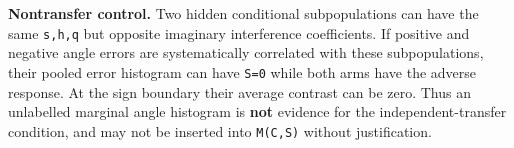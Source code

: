 \documentclass[
  10pt,
  a4paper,
]{article}
\begin{document}
\textbf{Nontransfer control.} Two hidden conditional subpopulations can have the same \texttt{s,h,q} but opposite imaginary interference coefficients. If positive and negative angle errors are systematically correlated with these subpopulations, their pooled error histogram can have \texttt{S=0} while both arms have the adverse response. At the sign boundary their average contrast can be zero. Thus an unlabelled marginal angle histogram is \textbf{not} evidence for the independent-transfer condition, and may not be inserted into \texttt{M(C,S)} without justification.
\end{document}
